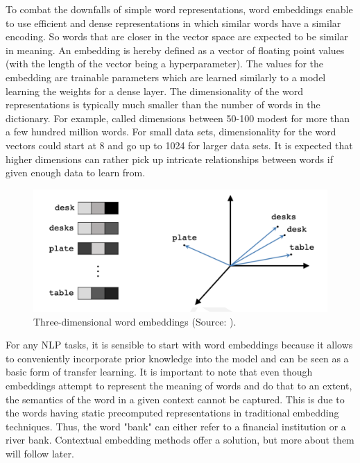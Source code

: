 \documentclass[
]{krantz}
\begin{document}
To combat the downfalls of simple word representations, word embeddings
enable to use efficient and dense representations in which similar words
have a similar encoding. So words that are closer in the vector space
are expected to be similar in meaning. An embedding is hereby defined as
a vector of floating point values (with the length of the vector being a
hyperparameter). The values for the embedding are trainable parameters
which are learned similarly to a model learning the weights for a dense
layer. The dimensionality of the word representations is typically much
smaller than the number of words in the dictionary. For example,
\citet{Mikolov2013} called dimensions between 50-100 modest for more than a
few hundred million words. For small data sets, dimensionality for the
word vectors could start at 8 and go up to 1024 for larger data sets. It
is expected that higher dimensions can rather pick up intricate
relationships between words if given enough data to learn from.

\begin{figure}

{\centering \includegraphics[width=0.7\linewidth]{./figures/01-01-nlp/embed_pilehvar_p11} 

}

\caption{Three-dimensional word embeddings (Source: \citet{Pilehvar2021}).}\label{fig:embedPilehvarP11}
\end{figure}



For any NLP tasks, it is sensible to start with word embeddings because
it allows to conveniently incorporate prior knowledge into the model and
can be seen as a basic form of transfer learning. It is important to
note that even though embeddings attempt to represent the meaning of
words and do that to an extent, the semantics of the word in a given
context cannot be captured. This is due to the words having static
precomputed representations in traditional embedding techniques. Thus,
the word "bank" can either refer to a financial institution or a river
bank. Contextual embedding methods offer a solution, but more about them
will follow later.\\
\end{document}
